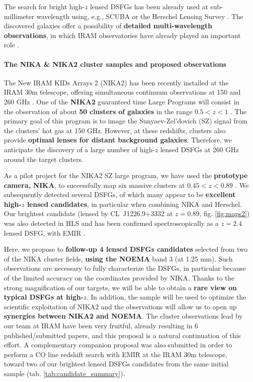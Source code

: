 \documentclass[11pt,a4paper,twoside,graphicx,color]{article}
\begin{document}
The search for bright high-$z$ lensed DSFGs has been already used at sub-millimeter wavelength using, e.g., SCUBA \citep{Knudsen2006} or the Herschel Lensing Survey \citep[HLS,][]{Egami2010}. The discovered galaxies offer a possibility of {\bf detailed multi-wavelength observations}, in which IRAM observatories have already played an important role \citep[e.g., a $z=5.2$ galaxy behind Abell 773,][]{Combes2012}.

\paragraph{\large The NIKA \& NIKA2 cluster samples and proposed observations}
The New IRAM KIDs Arrays 2 (NIKA2) has been recently installed at the IRAM 30m telescope, offering simultaneous continuum observations at 150 and 260 GHz \citep{Catalano2016}. One of the {\bf NIKA2} guaranteed time Large Programs will consist in the observation of about {\bf 50 clusters of galaxies} in the range $0.5 < z < 1$ \citep{Comis2016}. The primary goal of this program is to image the Sunyaev-Zel'dovich (SZ) signal from the clusters' hot gas at 150 GHz. However, at these redshifts, clusters also provide {\bf optimal lenses for distant background galaxies}. Therefore, we anticipate the discovery of a large number of high-$z$ lensed DSFGs at 260 GHz around the target clusters.

As a pilot project for the NIKA2 SZ large program, we have used the {\bf prototype camera, NIKA}, to successfully map six massive clusters at $0.45 < z < 0.89$ \citep{Adam2014,Adam2015,Adam2016a,Adam2016b,Ruppin2016}. We subsequently detected several DSFGs, of which many appear to be {\bf excellent high-$z$ lensed candidates}, in particular when combining NIKA and Herschel. Our brightest candidate (lensed by \mbox{CL~J1226.9+3332} at $z=0.89$, fig. \ref{fig:maps2}) was also detected in HLS and has been confirmed spectroscopically as a $z$$=$$2.4$ lensed DSFG, with EMIR \citep{Egami}.

Here, we propose to {\bf follow-up 4 lensed DSFGs candidates} selected from two of the NIKA cluster fields, {\bf using the NOEMA} band 3 (at 1.25 mm). Such observations are necessary to fully characterize the DSFGs, in particular because of the limited accuracy on the coordinates provided by NIKA. Thanks to the strong magnification of our targets, we will be able to obtain a {\bf rare view on typical DSFGs at high-$z$}. In addition, the sample will be used to optimize the scientific exploitation of NIKA2 and the observations will allow us to open up {\bf synergies between NIKA2 and NOEMA}. The cluster observations lead by our team at IRAM have been very fruitful, already resulting in 6 published/submitted papers, and this proposal is a natural continuation of this effort. A complementary companion proposal was also submitted in order to perform a CO line redshift search with EMIR at the IRAM 30m telescope, toward two of our brightest lensed DSFGs candidates from the same initial sample (tab. \ref{tab:candidate_summary}).
\end{document}
